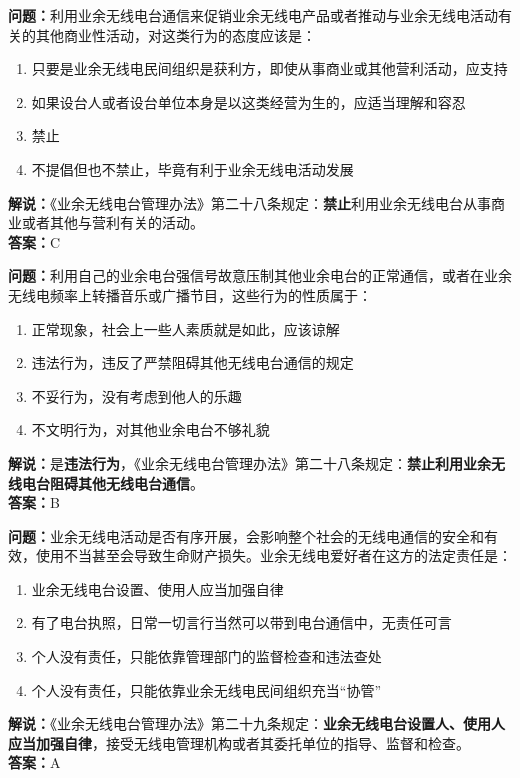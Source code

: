 \documentclass{ctexbook}
\begin{document}
\bigskip


\noindent\textbf{问题：}利用业余无线电台通信来促销业余无线电产品或者推动与业余无线电活动有关的其他商业性活动，对这类行为的态度应该是：
\begin{enumerate}[label=\Alph*), leftmargin=3em]
	\item 只要是业余无线电民间组织是获利方，即使从事商业或其他营利活动，应支持
	\item 如果设台人或者设台单位本身是以这类经营为生的，应适当理解和容忍
	\item 禁止
	\item 不提倡但也不禁止，毕竟有利于业余无线电活动发展
\end{enumerate}
\noindent\textbf{解说：}《业余无线电台管理办法》第二十八条规定：\textbf{禁止}利用业余无线电台从事商业或者其他与营利有关的活动。\\\noindent\textbf{答案：}C




\bigskip


\noindent\textbf{问题：}利用自己的业余电台强信号故意压制其他业余电台的正常通信，或者在业余无线电频率上转播音乐或广播节目，这些行为的性质属于：
\begin{enumerate}[label=\Alph*), leftmargin=3em]
	\item 正常现象，社会上一些人素质就是如此，应该谅解
	\item 违法行为，违反了严禁阻碍其他无线电台通信的规定
	\item 不妥行为，没有考虑到他人的乐趣
	\item 不文明行为，对其他业余电台不够礼貌
\end{enumerate}
\noindent\textbf{解说：}是\textbf{违法行为}，《业余无线电台管理办法》第二十八条规定：\textbf{禁止利用业余无线电台阻碍其他无线电台通信}。\\\noindent\textbf{答案：}B



\bigskip


\noindent\textbf{问题：}业余无线电活动是否有序开展，会影响整个社会的无线电通信的安全和有效，使用不当甚至会导致生命财产损失。业余无线电爱好者在这方的法定责任是：
\begin{enumerate}[label=\Alph*), leftmargin=3em]
	\item 业余无线电台设置、使用人应当加强自律
	\item 有了电台执照，日常一切言行当然可以带到电台通信中，无责任可言
	\item 个人没有责任，只能依靠管理部门的监督检查和违法查处
	\item 个人没有责任，只能依靠业余无线电民间组织充当“协管”
\end{enumerate}
\noindent\textbf{解说：}《业余无线电台管理办法》第二十九条规定：\textbf{业余无线电台设置人、使用人应当加强自律}，接受无线电管理机构或者其委托单位的指导、监督和检查。\\\noindent\textbf{答案：}A
\end{document}

